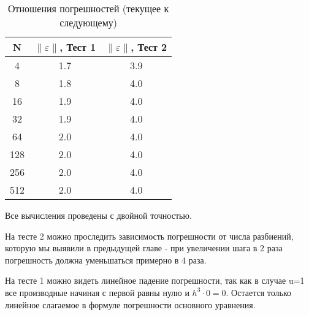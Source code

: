   \begin{table}[H]
    \centering
    \begin{tabular}{c | c | c}
      \toprule
      N & $ \left\lVert \varepsilon \right\rVert  $, Тест 1 & $ \left\lVert \varepsilon \right\rVert  $, Тест 2 \\
      \midrule
4 & 1.7 & 3.9 \\
8 & 1.8 & 4.0 \\
16 & 1.9 & 4.0 \\
32 & 1.9 & 4.0 \\
64 & 2.0 & 4.0 \\
128 & 2.0 & 4.0 \\
256 & 2.0 & 4.0 \\
512 & 2.0 & 4.0 \\
      \bottomrule
    \end{tabular}
    \caption{Отношения погрешностей (текущее к следующему)}
  \end{table}
Все вычисления проведены с двойной точностью.

На тесте 2 можно проследить зависимость погрешности от числа разбиений, которую мы выявили в предыдущей главе - при увеличении шага в 2 раза погрешность должна уменьшаться примерно в 4 раза.

На тесте 1 можно видеть линейное падение погрешности, так как в случае u=1 все производные начиная с первой равны нулю и $ h^3 \cdot 0 = 0 $. Остается только линейное слагаемое в формуле погрешности основного уравнения.
